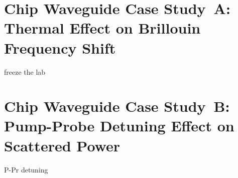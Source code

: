 \section{Chip Waveguide Case Study~A: Thermal Effect on Brillouin Frequency Shift}
\label{Raman:Appendix:sec:CaseStudyAThermal}

freeze the lab

\section{Chip Waveguide Case Study~B: Pump-Probe Detuning Effect on Scattered Power}
\label{Raman:Appendix:sec:CaseStudyBDetuning}

P-Pr detuning
